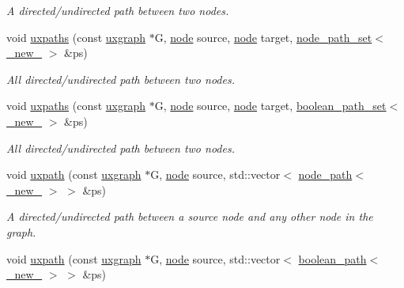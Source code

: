 \begin{DoxyCompactItemize}
\begin{DoxyCompactList}\small\item\em A directed/undirected path between two nodes. \end{DoxyCompactList}\item 
void \hyperlink{namespacelgraph_1_1traversal_a16078c9a8e08e18e017590e6e13860ec}{uxpaths} (const \hyperlink{classlgraph_1_1uxgraph}{uxgraph} $\ast$G, \hyperlink{namespacelgraph_a397169dd66adf725210a30fb7251773e}{node} source, \hyperlink{namespacelgraph_a397169dd66adf725210a30fb7251773e}{node} target, \hyperlink{namespacelgraph_a0570ce57129123d5816913d287f6cc73}{node\-\_\-path\-\_\-set}$<$ \hyperlink{namespacelgraph_a2836f966c1c36b43da337d8907728ec0}{\-\_\-new\-\_\-} $>$ \&ps)
\begin{DoxyCompactList}\small\item\em All directed/undirected path between two nodes. \end{DoxyCompactList}\item 
void \hyperlink{namespacelgraph_1_1traversal_a7421bd43fdc27c34609cb21b6ca99f84}{uxpaths} (const \hyperlink{classlgraph_1_1uxgraph}{uxgraph} $\ast$G, \hyperlink{namespacelgraph_a397169dd66adf725210a30fb7251773e}{node} source, \hyperlink{namespacelgraph_a397169dd66adf725210a30fb7251773e}{node} target, \hyperlink{namespacelgraph_afad432931ba600ab1628d5c9595986c5}{boolean\-\_\-path\-\_\-set}$<$ \hyperlink{namespacelgraph_a2836f966c1c36b43da337d8907728ec0}{\-\_\-new\-\_\-} $>$ \&ps)
\begin{DoxyCompactList}\small\item\em All directed/undirected path between two nodes. \end{DoxyCompactList}\item 
void \hyperlink{namespacelgraph_1_1traversal_a820cbf2f4ae33b2d358b3636679709fb}{uxpath} (const \hyperlink{classlgraph_1_1uxgraph}{uxgraph} $\ast$G, \hyperlink{namespacelgraph_a397169dd66adf725210a30fb7251773e}{node} source, std\-::vector$<$ \hyperlink{classlgraph_1_1node__path}{node\-\_\-path}$<$ \hyperlink{namespacelgraph_a2836f966c1c36b43da337d8907728ec0}{\-\_\-new\-\_\-} $>$ $>$ \&ps)
\begin{DoxyCompactList}\small\item\em A directed/undirected path between a source node and any other node in the graph. \end{DoxyCompactList}\item 
void \hyperlink{namespacelgraph_1_1traversal_a3a4182e7eb9e55c497118ba6c79d0b2d}{uxpath} (const \hyperlink{classlgraph_1_1uxgraph}{uxgraph} $\ast$G, \hyperlink{namespacelgraph_a397169dd66adf725210a30fb7251773e}{node} source, std\-::vector$<$ \hyperlink{classlgraph_1_1boolean__path}{boolean\-\_\-path}$<$ \hyperlink{namespacelgraph_a2836f966c1c36b43da337d8907728ec0}{\-\_\-new\-\_\-} $>$ $>$ \&ps)

\end{DoxyCompactItemize}

